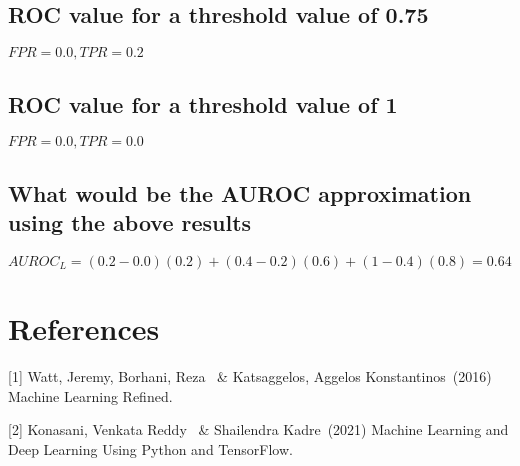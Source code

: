 \documentclass{article}
\begin{document}
\subsection{ROC value for a threshold value of 0.75}
$FPR=0.0,TPR=0.2$
\subsection{ROC value for a threshold value of 1}
$FPR=0.0,TPR=0.0$
\subsection{What would be the AUROC approximation using the above results}
$AUROC_L=(0.2-0.0)(0.2)+(0.4-0.2)(0.6)+(1-0.4)(0.8)=0.64$

\clearpage
\section*{References}
{
\small
[1] Watt, Jeremy, Borhani, Reza \ \& Katsaggelos, Aggelos Konstantinos\ (2016) Machine Learning Refined.

[2] Konasani, Venkata Reddy \ \& Shailendra Kadre\ (2021) Machine Learning and Deep Learning Using Python and TensorFlow.
}


\end{document}
